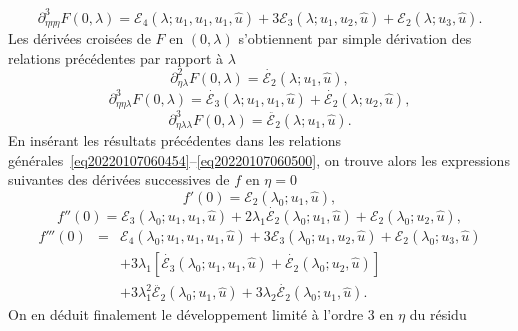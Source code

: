 \documentclass{article}
\newcommand{\nosymbol}{}
\begin{document}
\begin{equation}
  \partial_{\eta  \eta  \eta}^3 F (0, \lambda) =\mathcal{E}_4
  (\lambda ; u_1, u_1, u_1, \hat{u}) + 3\mathcal{E}_3 (\lambda ; u_1, u_2,
  \hat{u}) +\mathcal{E}_2 (\lambda ; u_3, \hat{u}) .
\end{equation}
Les dérivées croisées de $F$ en $(0, \lambda)$ s'obtiennent par
simple dérivation des relations précédentes par rapport à
$\lambda$
\begin{equation}
  \partial_{\eta  \lambda}^2 F (0, \lambda) = \dot{\mathcal{E}_2}
  (\lambda ; u_1, \hat{u}),
\end{equation}
\begin{equation}
  \partial_{\eta  \eta  \lambda}^3 F (0, \lambda) =
  \dot{\mathcal{E}_3} (\lambda ; u_1, u_1, \hat{u}) + \dot{\mathcal{E}_2}
  (\lambda ; u_2, \hat{u}),
\end{equation}
\begin{equation}
  \partial_{\eta  \lambda  \lambda}^3 F (0, \lambda) =
  \ddot{\mathcal{E}_2} (\lambda ; u_1, \hat{u}) .
\end{equation}
En insérant les résultats précédentes dans les relations
générales~\eqref{eq20220107060454}--\eqref{eq20220107060500}, on
trouve alors les expressions suivantes des dérivées successives de $f$
en $\eta = 0$
\begin{equation}
  f' (0) =\mathcal{E}_2 (\lambda_0 ; u_1, \hat{u}),
\end{equation}
\begin{equation}
  f'' (0) =\mathcal{E}_3 (\lambda_0 ; u_1, u_1, \hat{u}) + 2 \lambda_1
  \dot{\mathcal{E}_2} (\lambda_0 ; u_1, \hat{u}) +\mathcal{E}_2 (\lambda_0 ;
  u_2, \hat{u}),
\end{equation}
\begin{eqnarray}
  f''' (0) & = & \mathcal{E}_4 (\lambda_0 ; u_1, u_1, u_1, \hat{u}) +
  3\mathcal{E}_3 (\lambda_0 ; u_1, u_2, \hat{u}) +\mathcal{E}_2 (\lambda_0 ;
  u_3, \hat{u}) \nonumber\\
  &  & \nosymbol + 3 \lambda_1  [\dot{\mathcal{E}_3} (\lambda_0 ; u_1, u_1,
  \hat{u}) + \dot{\mathcal{E}_2} (\lambda_0 ; u_2, \hat{u})] \nonumber\\
  &  & \nosymbol + 3 \lambda_1^2  \ddot{\mathcal{E}_2} (\lambda_0 ; u_1,
  \hat{u}) + 3 \lambda_2  \dot{\mathcal{E}_2} (\lambda_0 ; u_1, \hat{u}) .
\end{eqnarray}
On en déduit finalement le développement limité à l'ordre 3 en
$\eta$ du résidu
\end{document}
